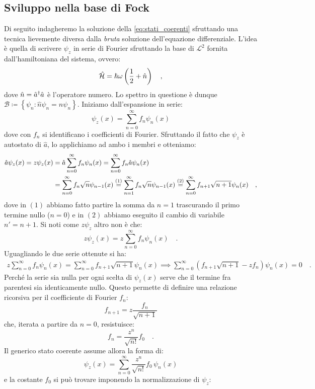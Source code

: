 \subsection{Sviluppo nella base di Fock}
Di seguito indagheremo la soluzione della \eqref{eq:stati_coerenti} sfruttando una tecnica lievemente diversa dalla \emph{bruta} soluzione dell'equazione differenziale. L'idea è quella di scrivere $\psi_z$ in serie di Fourier sfruttando la base di $\mathcal{L}^2$ fornita dall'hamiltoniana del sistema, ovvero:
\[
    \h{H} = \hbar \omega \left( \frac{1}{2} + \hat{n} \right) \quad,
\]
dove $\hat{n} = \hatd{a}\hat{a}$ è l'operatore numero. Lo spettro in questione è dunque $\mathcal{B} \coloneq \left\{ \psi_n : \hat{n}\psi_n = n\psi_n \right\}$. Iniziamo dall'espansione in serie:
\[
    \psi_z(x) = \sum_{n= 0}^\infty f_n \psi_n(x)
\]
dove con $f_n$ si identificano i coefficienti di Fourier. Sfruttando il fatto che $\psi_z$ è autostato di $\hat{a}$, lo applichiamo ad ambo i membri e otteniamo:
\[
    \begin{aligned}
        \hat{a}\psi_z(x) = z\psi_z(x) &= \hat{a}\sum_{n= 0}^\infty f_n \psi_n(x) = \sum_{n= 0}^\infty f_n \hat{a}\psi_n(x)\\ &= \sum_{n= 0}^\infty f_n \sqrt{n}\psi_{n-1}(x) \giustifica[=]{1} \sum_{n= 1}^\infty f_n \sqrt{n}\psi_{n-1}(x) \giustifica[=]{2} \sum_{n= 0}^\infty f_{n+1} \sqrt{n+1}\psi_{n}(x) \quad,
    \end{aligned}
\]
dove in $(1)$ abbiamo fatto partire la somma da $n=1$ trascurando il primo termine nullo ($n= 0$) e in $(2)$ abbiamo eseguito il cambio di variabile $n' = n+1$. Si noti come $z\psi_z$ altro non è che:
\[
    z\psi_z(x) = z \sum_{n= 0}^\infty f_n \psi_n(x) \quad.
\]
Uguagliando le due serie ottenute si ha:
\[
    \begin{aligned}
        z \sum_{n= 0}^\infty f_n \psi_n(x) = \sum_{n= 0}^\infty f_{n+1} \sqrt{n+1}\psi_{n}(x) \implies \sum_{n= 0}^\infty\left( f_{n+1}\sqrt{n+1} - zf_n \right)\psi_n(x) = 0 \quad.
    \end{aligned}
\]
Perché la serie sia nulla per ogni scelta di $\psi_z(x)$ serve che il termine fra parentesi sia identicamente nullo. Questo permette di definire una relazione ricorsiva per il coefficiente di Fourier $f_n$:
\[
    f_{n+1} =  z\frac{f_n}{\sqrt{n+1}} 
\]
che, iterata a partire da $n = 0$, resistuisce:
\[
    f_n = \frac{z^n}{\sqrt{n!}}f_0 \quad.
\]
Il generico stato coerente assume allora la forma di:
\[  
    \psi_z(x) = \sum_{n=0}^\infty \frac{z^n}{\sqrt{n!}}f_0\, \psi_n(x)
\]
e la costante $f_0$ si può trovare imponendo la normalizzazione di $\psi_z$:
